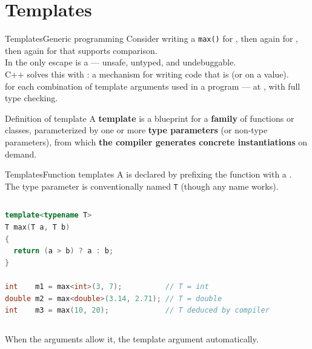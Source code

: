 
\section{Templates}
\graphicspath{{figs/section1/}}

\begin{frame}{Templates}{Generic programming}
	\justifying
	Consider writing a \texttt{max()}  for , then again for , then again for  that supports comparison.\\
	In  the only escape is a  — unsafe, untyped, and undebuggable.\\
	\bigskip
	C++ solves this with : a mechanism for writing code that is  (or on a value).\\
	 for each combination of template arguments used in a program — at , with full type checking.\\
	\bigskip
	\begin{block}{Definition of template}
		A \textbf{template} is a blueprint for a \textbf{family} of functions or classes, parameterized by one or more \textbf{type parameters} (or non-type parameters), from which \textbf{the compiler generates concrete instantiations} on demand.
	\end{block}
\end{frame}
\begin{frame}[fragile]{Templates}{Function templates}
	\justifying
	A  is declared by prefixing the function with a .\\
	The type parameter is conventionally named \texttt{T} (though any name works).
	\begin{columns}
		\begin{lstlisting}[style=codebeamer, language=C++, caption=A function template and some instantiations.]
template<typename T>
T max(T a, T b)
{
  return (a > b) ? a : b;
}

int    m1 = max<int>(3, 7);          // T = int
double m2 = max<double>(3.14, 2.71); // T = double
int    m3 = max(10, 20);             // T deduced by compiler
    \end{lstlisting}
	\end{columns}
	When the arguments allow it,  the template argument automatically.
\end{frame}
